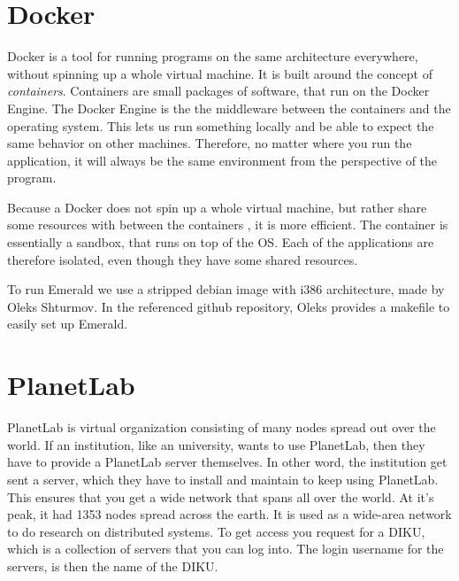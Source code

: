 
\section{Docker}\label{background:docker}
Docker is a tool for running programs on the same architecture everywhere, without spinning up a whole virtual machine. It is built around the concept of \textit{containers}. Containers are small packages of software, that run on the Docker Engine. The Docker Engine is the the middleware between the containers and the operating system. This lets us run something locally and be able to expect the same behavior on other machines. Therefore, no matter where you run the application, it will always be the same environment from the perspective of the program. 

Because a Docker does not spin up a whole virtual machine, but rather share some resources with between the containers \cite{dockercom_what_nodate}, it is more efficient. The container is essentially a sandbox, that runs on top of the OS. Each of the applications are therefore isolated, even though they have some shared resources.

To run Emerald we use a stripped debian image with i386 architecture, made by Oleks Shturmov\cite{oleks_oleksdocker-in5570v21_2021}.
In the referenced github repository, Oleks provides a makefile to easily set up Emerald.



\section{PlanetLab}
PlanetLab is virtual organization consisting of many nodes spread out over the world. If an institution, like an university, wants to use PlanetLab, then they have to provide a PlanetLab server themselves. In other word, the institution get sent a server, which they have to install and maintain to keep using PlanetLab. This ensures that you get a wide network that spans all over the world. At it's peak, it had 1353 nodes spread across the earth\cite{noauthor_planetlab_nodate}. It is used as a wide-area network to do research on distributed systems. To get access you request for a DIKU, which is a collection of servers that you can log into. The login username for the servers, is then the name of the DIKU.

